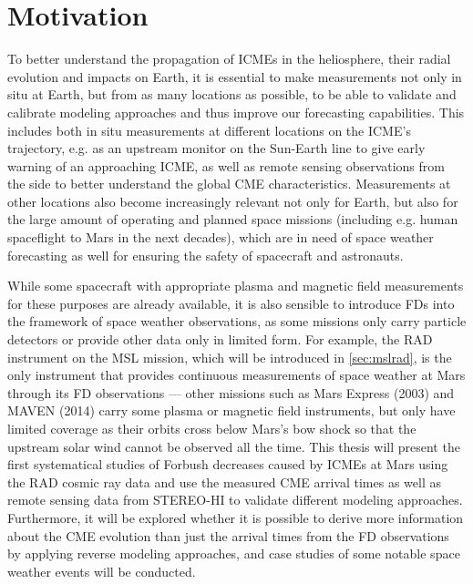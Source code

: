 \section{Motivation}
\label{sec:motivation}

To better understand the propagation of \acp{ICME} in the heliosphere, their radial evolution and impacts on Earth, it is essential to make measurements not only in situ at Earth, but from as many locations as possible, to be able to validate and calibrate modeling approaches and thus improve our forecasting capabilities. This includes both in situ measurements at different locations on the \ac{ICME}'s trajectory, e.g. as an upstream monitor on the Sun-Earth line to give early warning of an approaching \ac{ICME}, as well as remote sensing observations from the side to better understand the global \ac{CME} characteristics. Measurements at other locations also become increasingly relevant not only for Earth, but also for the large amount of operating and planned space missions (including e.g. human spaceflight to Mars in the next decades), which are in need of space weather forecasting as well for ensuring the safety of spacecraft and astronauts.

While some spacecraft with appropriate plasma and magnetic field measurements for these purposes are already available, it is also sensible to introduce \acp{FD} into the framework of space weather observations, as some missions only carry particle detectors or provide other data only in limited form. For example, the \ac{RAD} instrument on the \ac{MSL} mission, which will be introduced in \autoref{sec:mslrad}, is the only instrument that provides continuous measurements of space weather at Mars through its \ac{FD} observations --- other missions such as Mars Express (2003) and MAVEN (2014) carry some plasma or magnetic field instruments, but only have limited coverage as their orbits cross below Mars's bow shock so that the upstream solar wind cannot be observed all the time. This thesis will present the first systematical studies of Forbush decreases caused by \acp{ICME} at Mars using the \ac{RAD} cosmic ray data and use the measured \ac{CME} arrival times as well as remote sensing data from \ac{STEREO}-\ac{HI} to validate different modeling approaches. Furthermore, it will be explored whether it is possible to derive more information about the \ac{CME} evolution than just the arrival times from the \ac{FD} observations by applying reverse modeling approaches, and case studies of some notable space weather events will be conducted.

